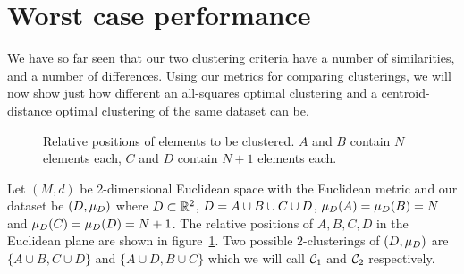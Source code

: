 \section{Worst case performance}
\label{sec:worst-case-perf}

We have so far seen that our two clustering criteria have a number of
similarities, and a number of differences.  Using our metrics for comparing
clusterings, we will now show just how different an all-squares optimal
clustering and a centroid-distance optimal clustering of the same dataset can
be.

\begin{figure}
  \centering
  \caption{Relative positions of elements to be clustered.  $A$ and $B$
    contain $N$ elements each, $C$ and $D$ contain $N+1$ elements each.}
  \label{fig:clusters}
\end{figure}

Let $(M,d)$ be 2-dimensional Euclidean space with the Euclidean metric and our
dataset be $(D, \mu_{D})$ where $D \subset \mathbb{R}^2$, $D =
A \cup B \cup C \cup D$, $\mu_{D}(A)=\mu_{D}(B)=N$ and
$\mu_{D}(C)=\mu_{D}(D)=N+1$.  The relative positions of $A,B,C,D$ in
the Euclidean plane are shown in figure~\ref{fig:clusters}.  Two possible
$2$-clusterings of $(D,\mu_{D})$ are $\{A \cup B,C \cup D\}$ and $\{A
\cup D,B \cup C\}$ which we will call $\mathcal{C}_1$ and $\mathcal{C}_2$ respectively.

